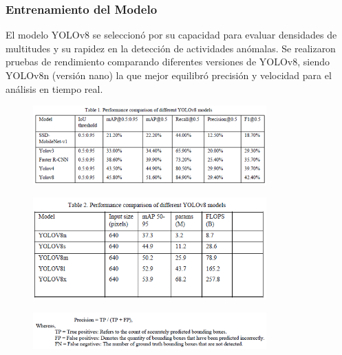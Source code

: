 \documentclass[listof=nochaptergap,12pt,times,authoryear]{report}
\begin{document}
\subsubsection{Entrenamiento del Modelo}
El modelo YOLOv8 se seleccionó por su capacidad para evaluar densidades de multitudes y su rapidez en la detección de actividades anómalas. Se realizaron pruebas de rendimiento comparando diferentes versiones de YOLOv8, siendo YOLOv8n (versión nano) la que mejor equilibró precisión y velocidad para el análisis en tiempo real.

\begin{figure}[h] %
    \centering
    \includegraphics[width=0.8\textwidth]{tab1.1.png} %
    \label{fig:ejemplo} %
\end{figure}

\begin{figure}[h] %
    \centering
    \includegraphics[width=0.8\textwidth]{tab1.2.png} %
    \label{fig:ejemplo} %
\end{figure}

\begin{figure}[h] %
    \centering
    \includegraphics[width=0.8\textwidth]{tab1.3.png} %
    \label{fig:ejemplo} %
\end{figure}
\end{document}
